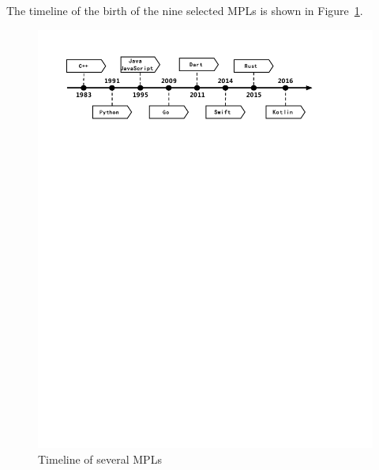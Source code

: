 The timeline of the birth of the nine selected MPLs is shown in Figure~\ref{fig:timeline}.

\begin{figure}[htbp]
    \centerline{\includegraphics[scale=0.6]{figures/timeline}}
    \caption{Timeline of several MPLs}
    \label{fig:timeline}
\end{figure}



